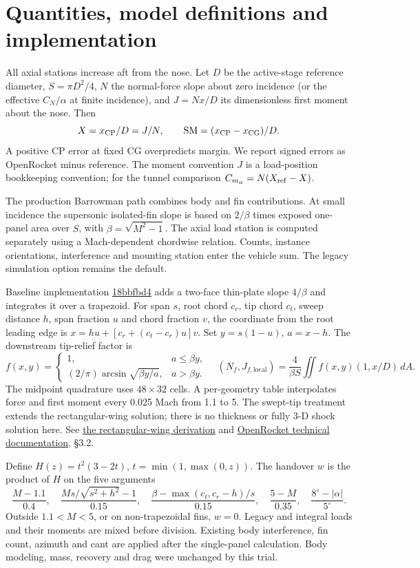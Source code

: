 \documentclass[10pt,letterpaper]{article}
\newcommand{\sub}[1]{\smallskip\noindent{\bfseries\color{navy}#1}\quad}
\begin{document}
\section{Quantities, model definitions and implementation}
All axial stations increase aft from the nose. Let $D$ be the active-stage reference diameter, $S=\pi D^2/4$, $N$ the normal-force slope about zero incidence (or the effective $C_N/\alpha$ at finite incidence), and $J=Nx/D$ its dimensionless first moment about the nose. Then
\[
 X=x_{\rm CP}/D=J/N,\qquad {\rm SM}=(x_{\rm CP}-x_{\rm CG})/D.
\]
A positive CP error at fixed CG overpredicts margin. We report signed errors as OpenRocket minus reference. The moment convention $J$ is a load-position bookkeeping convention; for the tunnel comparison $C_{m_\alpha}=N(X_{\rm ref}-X)$.
 
\sub{Legacy.} The production Barrowman path combines body and fin contributions. At small incidence the supersonic isolated-fin slope is based on $2/\beta$ times exposed one-panel area over $S$, with $\beta=\sqrt{M^2-1}$. The axial load station is computed separately using a Mach-dependent chordwise relation. Counts, instance orientations, interference and mounting station enter the vehicle sum. The legacy simulation option remains the default.
 
\sub{Full finite wing.} Baseline implementation \href{https://github.com/MDNich/ActiveControl_MIT_RktTeam/commit/18bbfbd4}{18bbfbd4} adds a two-face thin-plate slope $4/\beta$ and integrates it over a trapezoid. For span $s$, root chord $c_r$, tip chord $c_t$, sweep distance $h$, span fraction $u$ and chord fraction $v$, the coordinate from the root leading edge is $x=hu+[c_r+(c_t-c_r)u]v$. Set $y=s(1-u)$, $a=x-h$. The downstream tip-relief factor is
\[
 f(x,y)=\begin{cases}1,&a\le\beta y,\\(2/\pi)\arcsin\sqrt{\beta y/a},&a>\beta y.\end{cases}
 \quad
 (N_f,J_{f,\mathrm{local}})=\frac{4}{\beta S}\iint f(x,y)(1,x/D)\,dA.
\]
The midpoint quadrature uses $48\times32$ cells. A per-geometry table interpolates force and first moment every 0.025 Mach from 1.1 to 5. The swept-tip treatment extends the rectangular-wing solution; there is no thickness or fully 3-D shock solution here. See \href{https://farside.ph.utexas.edu/teaching/336L/Fluidhtml/node220.html}{the rectangular-wing derivation} and \href{https://openrocket.sourceforge.net/techdoc.pdf}{OpenRocket technical documentation}, \S3.2.
 
\sub{Where it can contribute.} Define $H(z)=t^2(3-2t)$, $t=\min(1,\max(0,z))$. The handover $w$ is the product of $H$ on the five arguments
\[
 \frac{M-1.1}{0.4},\quad \frac{M s/\sqrt{s^2+h^2}-1}{0.15},\quad
 \frac{\beta-\max(c_t,c_r-h)/s}{0.15},\quad \frac{5-M}{0.35},\quad
 \frac{8^\circ-|\alpha|}{5^\circ}.
\]
Outside $1.1<M<5$, or on non-trapezoidal fins, $w=0$. Legacy and integral loads and their moments are mixed before division. Existing body interference, fin count, azimuth and cant are applied after the single-panel calculation. Body modeling, mass, recovery and drag were unchanged by this trial.
 
\end{document}
